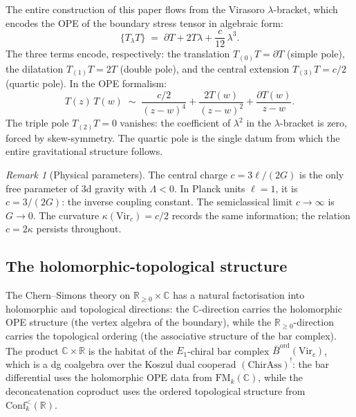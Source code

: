\documentclass[11pt,reqno]{amsart}
\theoremstyle{definition}
\theoremstyle{remark}
\newtheorem{remark}[theorem]{Remark}
\begin{document}
The entire construction of this paper flows from the Virasoro
$\lambda$-bracket, which encodes the OPE of the boundary stress
tensor in algebraic form:
\begin{equation}\label{eq:vir-lambda-bracket}
\{T{}_\lambda T\}
\;=\;
\partial T + 2T\lambda + \frac{c}{12}\,\lambda^3.
\end{equation}
The three terms encode, respectively: the translation
$T_{(0)}T = \partial T$ (simple pole), the dilatation
$T_{(1)}T = 2T$ (double pole), and the central extension
$T_{(3)}T = c/2$ (quartic pole). In the OPE formalism:
\begin{equation}\label{eq:vir-ope}
T(z)\,T(w) \;\sim\;
\frac{c/2}{(z-w)^4} + \frac{2T(w)}{(z-w)^2}
+ \frac{\partial T(w)}{z-w}.
\end{equation}
The triple pole $T_{(2)}T = 0$ vanishes: the coefficient of
$\lambda^2$ in the $\lambda$-bracket is zero, forced by
skew-symmetry. The quartic pole is the single datum from which
the entire gravitational structure follows.

\begin{remark}[Physical parameters]
\label{rem:physical-parameters}
The central charge $c = 3\ell/(2G)$ is the only free parameter of
3d gravity with $\Lambda < 0$. In Planck units $\ell = 1$, it is
$c = 3/(2G)$: the inverse coupling constant. The semiclassical limit
$c \to \infty$ is $G \to 0$. The curvature
$\kappa(\mathrm{Vir}_c) = c/2$
records the same information; the relation $c = 2\kappa$ persists
throughout.
\end{remark}

\subsection{The holomorphic-topological structure}

The Chern--Simons theory on $\mathbb{R}_{\ge 0} \times \mathbb{C}$
has a natural factorisation into holomorphic and topological
directions: the $\mathbb{C}$-direction carries the holomorphic OPE
structure (the vertex algebra of the boundary), while the
$\mathbb{R}_{\ge 0}$-direction carries the topological ordering
(the associative structure of the bar complex). The product
$\mathbb{C} \times \mathbb{R}$ is the habitat of the $E_1$-chiral
bar complex $\bar{B}^{\mathrm{ord}}(\mathrm{Vir}_c)$, which is a
dg coalgebra over the Koszul dual cooperad
$(\mathrm{ChirAss})^!$: the bar differential uses the holomorphic
OPE data from $\mathrm{FM}_k(\mathbb{C})$, while the deconcatenation
coproduct uses the ordered topological structure from
$\mathrm{Conf}_k^<(\mathbb{R})$.
\end{document}
